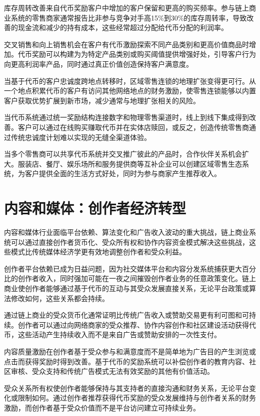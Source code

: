 \documentclass[
  Letterpaper,
]{scrbook}
\begin{document}
库存周转改善来自代币奖励客户中增加的客户保留和更高的购买频率。参与链上商业系统的零售商家通常报告比非参与竞争对手高15\%到30\%的库存周转率，导致改善的现金流和减少的持有成本，这些经常超过分配给代币分配的利润率。

交叉销售和向上销售机会在客户有代币激励探索不同产品类别和更高价值商品时增加。代币奖励可以构建为为特定产品类别或购买阈值提供增强好处，引导客户行为向更高利润率产品，同时通过真正价值创造保持客户满意度。

当基于代币的客户忠诚度跨地点转移时，区域零售连锁的地理扩张变得更可行。从一个地点积累代币的客户有访问其他网络地点的财务激励，使零售连锁能够以内置客户获取优势扩展到新市场，减少通常与地理扩张相关的风险。

当代币系统通过统一奖励结构连接数字和物理零售渠道时，线上到线下集成得到改善。客户可以通过在线购买赚取代币并在实体店赎回，或反之，创造传统零售商通过传统忠诚度计划难以实现的无缝全渠道体验。

当多个零售商可以共享代币系统并交叉推广彼此的产品时，合作伙伴关系机会扩大。服装店、餐厅、娱乐场所和服务提供商等互补企业可以创建区域零售生态系统，为客户提供全面的生活方式好处，同时为参与商家产生推荐收入。

\section{内容和媒体：创作者经济转型}\label{ux5185ux5bb9ux548cux5a92ux4f53ux521bux4f5cux8005ux7ecfux6d4eux8f6cux578b}

内容和媒体行业面临平台依赖、算法变化和广告收入波动的重大挑战，链上商业系统可以通过直接创作者货币化、受众所有权和协作内容资金模式解决这些挑战，这些模式比传统媒体经济学更有效地调整创作者和受众利益。

创作者平台依赖已成为日益问题，因为社交媒体平台和内容分发系统捕获更大百分比的创作者收入，同时强加可能在一夜之间摧毁创作者业务的任意政策变化。链上商业使创作者能够通过基于代币的互动与其受众发展直接关系，无论平台政策或算法修改如何，这些关系都会持续。

通过链上商业的受众货币化通常证明比传统广告收入或赞助交易更有利可图和可持续。创作者可以通过向网络商家的受众推荐、协作内容创作和社区建设活动获得代币，这些活动产生持续收入而不是来自广告或赞助安排的一次性支付。

内容质量激励在创作者基于受众参与和满意度而不是简单地为广告目的产生浏览或点击而获得奖励时得到改善。基于代币的奖励系统可以补偿创作者的教育内容、社区审核、受众支持和传统广告模式无法有效奖励的其他有价值活动。

受众关系所有权使创作者能够保持与其支持者的直接沟通和财务关系，无论平台变化或限制如何。通过创作者推荐获得代币奖励的受众发展维持与创作者关系的财务激励，而创作者基于受众价值而不是平台访问建立可持续业务。
\end{document}
